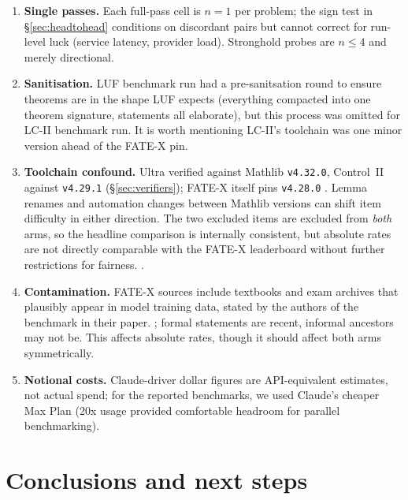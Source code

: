 \documentclass[12pt, a4paper]{article}
\begin{document}
\begin{enumerate}[itemsep=2pt]
\item \textbf{Single passes.} Each full-pass cell is $n{=}1$ per problem; the
      sign test in \S\ref{sec:headtohead} conditions on discordant pairs but
      cannot correct for run-level luck (service latency, provider load).
      Stronghold probes are $n{\le}4$ and merely directional.
\item \textbf{Sanitisation.} LUF benchmark run had a pre-sanitsation round to ensure 
      theorems are in the shape LUF expects (everything compacted into one theorem signature,
      statements all elaborate), but this process was omitted for LC-II benchmark run.
      It is worth mentioning LC-II's toolchain was one minor version ahead of
      the FATE-X pin. 
\item \textbf{Toolchain confound.} Ultra verified against Mathlib
      \texttt{v4.32.0}, Control~II against \texttt{v4.29.1}
      (\S\ref{sec:verifiers}); FATE-X itself pins \texttt{v4.28.0}
      \cite{fatex2025}. Lemma renames and automation changes between Mathlib
      versions can shift item difficulty in either direction. The two
      excluded items are excluded from \emph{both} arms, so the headline
      comparison is internally consistent, but absolute rates are not
      directly comparable with the FATE-X leaderboard without further
      restrictions for fairness.
      \cite{benchmarklist_fatex}.
\item \textbf{Contamination.} FATE-X sources include textbooks and exam
      archives that plausibly appear in model training data, stated by
      the authors of the benchmark in their paper.
      \cite{anthropic2026sonnet5}; formal statements are recent, informal
      ancestors may not be. This affects absolute rates, though it should
      affect both arms symmetrically.
\item \textbf{Notional costs.} Claude-driver dollar figures are
      API-equivalent estimates, not actual spend; for the reported benchmarks,
      we used Claude's cheaper Max Plan (20x usage provided comfortable headroom for 
      parallel benchmarking).
\end{enumerate}

\section{Conclusions and next steps}
\label{sec:nextsteps}
\end{document}
